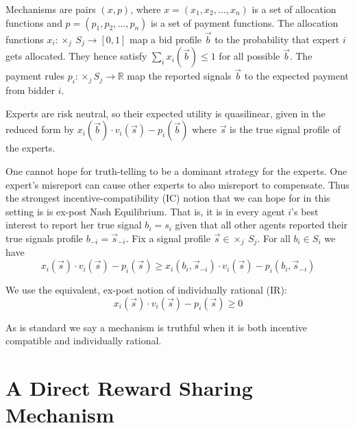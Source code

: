 Mechanisms are pairs $(x,p)$, where $x=(x_1,x_2,\ldots,x_n)$ is a set of allocation functions and $p=(p_1,p_2,\ldots,p_n)$ is a set of payment functions.
The allocation functions $x_i:\times_j \ S_j\rightarrow [0,1]$ map a bid profile $\vec{b}$ to the probability that expert $i$ gets allocated. They hence satisfy $\sum_i x_i(\vec{b}) \leq 1$ for all possible $\vec{b}$.
The payment rules $p_i: \times _j S_j \rightarrow \mathbb R$ map the reported signals $\vec{b}$ to the expected payment from bidder $i$.

Experts are risk neutral, so their expected utility is quasilinear, given in the reduced form by $x_i (\vec{b}) \cdot v_i(\vec{s}) - p_i(\vec{b})$ where $\vec{s}$ is the true signal profile of the experts.


One cannot hope for truth-telling to be a dominant strategy for the experts. One expert's misreport can cause other experts to also misreport to compensate. Thus the strongest incentive-compatibility (IC) notion that we can hope for in this setting is is ex-post Nash Equilibrium. That is, it is in every agent $i$'s best interest to report her true signal $b_i = s_i$ given that all other agents reported their true signals profile $b_{-i} = \vec{s}_{-i}$. Fix a signal profile $\vec{s} \in \times _{j} \  S_j$. For all $b_i \in S_i$ we have $$x_i(\vec{s}) \cdot v_i(\vec{s}) - p_i(\vec{s}) \geq x_i(b_i, \vec{s}_{-i}) \cdot v_i(\vec{s}) - p_i(b_i, \vec{s}_{-i})$$

We use the equivalent, ex-post notion of individually rational (IR): $$x_i(\vec{s}) \cdot v_i(\vec{s}) - p_i(\vec{s}) \geq 0$$

As is standard we say a mechanism is truthful when it is both incentive compatible and individually rational.



\section{A Direct Reward Sharing Mechanism}

